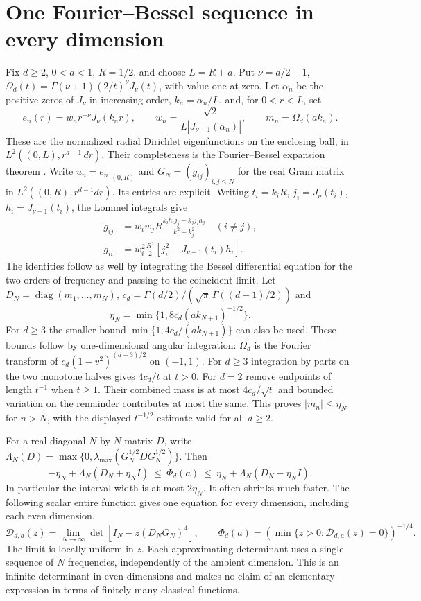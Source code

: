 \documentclass[11pt,a4paper]{article}
\numberwithin{equation}{section}
\begin{document}
\section{One Fourier--Bessel sequence in every dimension}
\label{sec:ef-fourier-bessel}
Fix $d\ge2$, $0<a<1$, $R=1/2$, and choose $L=R+a$. Put $\nu=d/2-1$, $\Omega_d(t)=\Gamma(\nu+1)(2/t)^\nu J_\nu(t)$, with value one at zero. Let $\alpha_n$ be the positive zeros of $J_\nu$ in increasing order, $k_n=\alpha_n/L$, and, for $0<r<L$, set
\[
 e_n(r)=w_n r^{-\nu}J_\nu(k_n r),\qquad w_n=\frac{\sqrt2}{L|J_{\nu+1}(\alpha_n)|},\qquad
 m_n=\Omega_d(ak_n).
\]
These are the normalized radial Dirichlet eigenfunctions on the enclosing ball, in $L^2((0,L),r^{d-1}\,dr)$. Their completeness is the Fourier--Bessel expansion theorem \cite[Sec.~10.23(iii)]{DLMFBessel}. Write $u_n=e_n|_{(0,R)}$ and $G_N=(g_{ij})_{i,j\le N}$ for the real Gram matrix in $L^2((0,R),r^{d-1}dr)$. Its entries are explicit. Writing $t_i=k_iR$, $j_i=J_\nu(t_i)$, $h_i=J_{\nu+1}(t_i)$, the Lommel integrals give
\begin{align*}
 g_{ij}&=w_iw_j R\frac{k_i h_i j_j-k_j j_i h_j}{k_i^2-k_j^2}\quad(i\ne j),\\
 g_{ii}&=w_i^2\frac{R^2}{2}\left[j_i^2-J_{\nu-1}(t_i)h_i\right].
\end{align*}
The identities follow as well by integrating the Bessel differential equation for the two orders of frequency and passing to the coincident limit. Let $D_N=\operatorname{diag}(m_1,\ldots,m_N)$, $c_d=\Gamma(d/2)/(\sqrt\pi\,\Gamma((d-1)/2))$ and
\[
 \eta_N=\min\{1,8c_d(ak_{N+1})^{-1/2}\}.
\]
For $d\ge3$ the smaller bound $\min\{1,4c_d/(ak_{N+1})\}$ can also be used. These bounds follow by one-dimensional angular integration: $\Omega_d$ is the Fourier transform of $c_d(1-v^2)^{(d-3)/2}$ on $(-1,1)$. For $d\ge3$ integration by parts on the two monotone halves gives $4c_d/t$ at $t>0$. For $d=2$ remove endpoints of length $t^{-1}$ when $t\ge1$. Their combined mass is at most $4c_d/\sqrt{t}$ and bounded variation on the remainder contributes at most the same. This proves $|m_n|\le\eta_N$ for $n>N$, with the displayed $t^{-1/2}$ estimate valid for all $d\ge2$.

For a real diagonal $N$-by-$N$ matrix $D$, write $\Lambda_N(D)=\max\{0,\lambda_{\max}(G_N^{1/2}DG_N^{1/2})\}$. Then
\begin{equation}\label{eq:ef-bessel-enclosures}
 -\eta_N+\Lambda_N(D_N+\eta_N I)\ \le\ \Phi_d(a)\ \le\
 \eta_N+\Lambda_N(D_N-\eta_N I).
\end{equation}
In particular the interval width is at most $2\eta_N$. It often shrinks much faster. The following scalar entire function gives one equation for every dimension, including each even dimension,
\begin{equation}\label{eq:ef-bessel-secular}
 \mathcal D_{d,a}(z)=\lim_{N\to\infty}\det\!\left[I_N-z(D_NG_N)^4\right],
 \qquad \Phi_d(a)=\left(\min\{z>0:\mathcal D_{d,a}(z)=0\}\right)^{-1/4}.
\end{equation}
The limit is locally uniform in $z$. Each approximating determinant uses a single sequence of $N$ frequencies, independently of the ambient dimension. This is an infinite determinant in even dimensions and makes no claim of an elementary expression in terms of finitely many classical functions.
\end{document}
